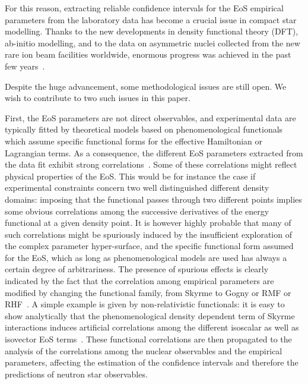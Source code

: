 \documentclass
[aps,prc,twocolumn,showpacs,showkeys,amsmath,floatfix,superscriptaddress]{revtex4}
\begin{document}
For this reason, extracting reliable confidence intervals for the EoS empirical parameters from the laboratory data has become a crucial issue in compact star modelling. Thanks to the new developments in density functional theory (DFT), ab-initio modelling, and to the data on asymmetric nuclei collected from the new rare ion beam facilities worldwide, enormous progress was achieved in the past few years~\cite{tsang_rep,lattimer_lim,lattimer_steiner,dutra14,steiner_bayes,fortin16}.

Despite the huge advancement, some methodological issues are still open. We wish to contribute to two such issues in this paper.

First, the EoS parameters are not direct observables, and experimental data are typically fitted by theoretical models based on phenomenological functionals which assume specific functional forms for the effective  Hamiltonian or Lagrangian terms.
As a consequence, the different EoS parameters extracted from the data fit exhibit strong correlations~\cite{Kortelainen12,Nazarewicz14,Danielewicz14,McDonnel15}. Some of these correlations might reflect physical properties of the EoS. This would be for instance the case if experimental constraints concern two well distinguished different density domains: imposing that the functional passes through two different points  implies some obvious correlations among the successive derivatives of the energy functional at a given density point. It is however highly probable that many of such correlations might be spuriously induced by the insufficient exploration of the complex parameter hyper-surface, and the specific functional form assumed for the EoS, which as long as phenomenological models are used has always a certain degree of arbitrariness. The presence of spurious effects is clearly indicated by the fact that the correlation among empirical parameters are modified by changing the functional family, from Skyrme to Gogny or RMF or RHF~\cite{Nazarewicz14,Ducoin2011,KhanMargueron,Casali1,Mondal}.  A simple example is given by non-relativistic functionals: it is easy to show analytically that the phenomenological density dependent term of Skyrme interactions induces artificial correlations among the different isoscalar as well as isovector EoS terms~\cite{KhanMargueron}. 
These functional correlations are then propagated to the analysis of the correlations among the nuclear observables and the empirical parameters, affecting the estimation of the confidence intervals and therefore the predictions of neutron star observables. 
\end{document}
